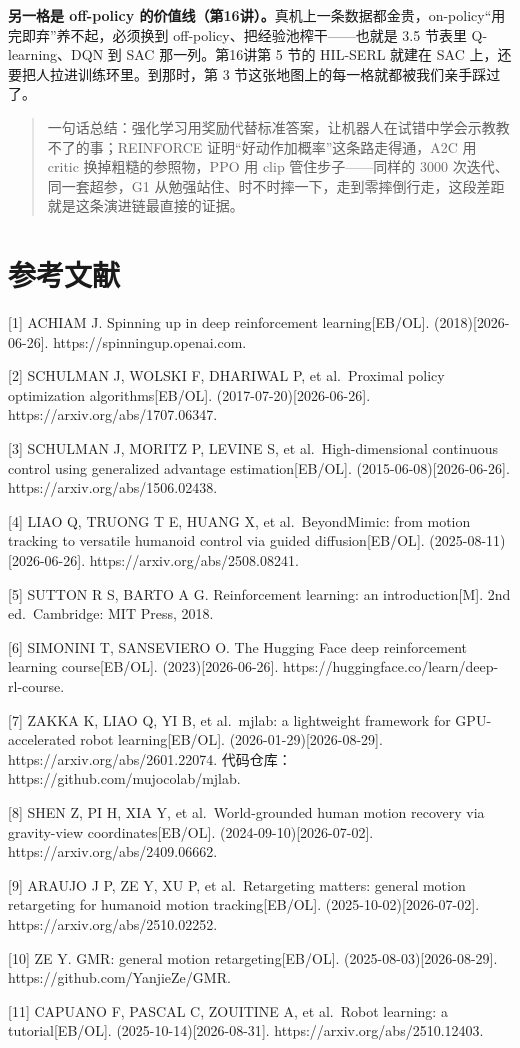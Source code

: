 \documentclass[
  chinese,
]{ctexart}
\begin{document}
\textbf{另一格是 off-policy
的价值线（第16讲）。}真机上一条数据都金贵，on-policy``用完即弃''养不起，必须换到
off-policy、把经验池榨干------也就是 3.5 节表里 Q-learning、DQN 到 SAC
那一列。第16讲第 5 节的 HIL-SERL 就建在 SAC
上，还要把人拉进训练环里。到那时，第 3
节这张地图上的每一格就都被我们亲手踩过了。

\begin{quote}
一句话总结：强化学习用奖励代替标准答案，让机器人在试错中学会示教教不了的事；REINFORCE
证明``好动作加概率''这条路走得通，A2C 用 critic 换掉粗糙的参照物，PPO 用
clip 管住步子------同样的 3000 次迭代、同一套超参，G1
从勉强站住、时不时摔一下，走到零摔倒行走，这段差距就是这条演进链最直接的证据。
\end{quote}

\section{参考文献}\label{ux53c2ux8003ux6587ux732e}

{[}1{]} ACHIAM J. Spinning up in deep reinforcement learning{[}EB/OL{]}.
(2018){[}2026-06-26{]}. https://spinningup.openai.com.

{[}2{]} SCHULMAN J, WOLSKI F, DHARIWAL P, et al.~Proximal policy
optimization algorithms{[}EB/OL{]}. (2017-07-20){[}2026-06-26{]}.
https://arxiv.org/abs/1707.06347.

{[}3{]} SCHULMAN J, MORITZ P, LEVINE S, et al.~High-dimensional
continuous control using generalized advantage estimation{[}EB/OL{]}.
(2015-06-08){[}2026-06-26{]}. https://arxiv.org/abs/1506.02438.

{[}4{]} LIAO Q, TRUONG T E, HUANG X, et al.~BeyondMimic: from motion
tracking to versatile humanoid control via guided diffusion{[}EB/OL{]}.
(2025-08-11){[}2026-06-26{]}. https://arxiv.org/abs/2508.08241.

{[}5{]} SUTTON R S, BARTO A G. Reinforcement learning: an
introduction{[}M{]}. 2nd ed.~Cambridge: MIT Press, 2018.

{[}6{]} SIMONINI T, SANSEVIERO O. The Hugging Face deep reinforcement
learning course{[}EB/OL{]}. (2023){[}2026-06-26{]}.
https://huggingface.co/learn/deep-rl-course.

{[}7{]} ZAKKA K, LIAO Q, YI B, et al.~mjlab: a lightweight framework for
GPU-accelerated robot learning{[}EB/OL{]}. (2026-01-29){[}2026-08-29{]}.
https://arxiv.org/abs/2601.22074.
代码仓库：https://github.com/mujocolab/mjlab.

{[}8{]} SHEN Z, PI H, XIA Y, et al.~World-grounded human motion recovery
via gravity-view coordinates{[}EB/OL{]}. (2024-09-10){[}2026-07-02{]}.
https://arxiv.org/abs/2409.06662.

{[}9{]} ARAUJO J P, ZE Y, XU P, et al.~Retargeting matters: general
motion retargeting for humanoid motion tracking{[}EB/OL{]}.
(2025-10-02){[}2026-07-02{]}. https://arxiv.org/abs/2510.02252.

{[}10{]} ZE Y. GMR: general motion retargeting{[}EB/OL{]}.
(2025-08-03){[}2026-08-29{]}. https://github.com/YanjieZe/GMR.

{[}11{]} CAPUANO F, PASCAL C, ZOUITINE A, et al.~Robot learning: a
tutorial{[}EB/OL{]}. (2025-10-14){[}2026-08-31{]}.
https://arxiv.org/abs/2510.12403.
\end{document}
